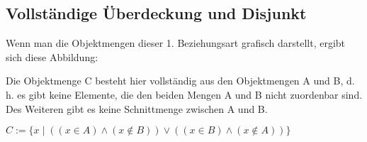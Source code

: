       \subsection{Vollst\"andige \"Uberdeckung und Disjunkt}
        \label{complette_disjunkt}
        Wenn man die Objektmengen dieser 1. Beziehungsart grafisch darstellt,
        ergibt sich diese Abbildung:

        \begin{center}
        \end{center}
        Die Objektmenge C besteht hier vollst\"andig aus den Objektmengen A und
        B, d. h. es gibt keine Elemente, die den beiden Mengen A und B nicht
        zuordenbar sind. Des Weiteren gibt es keine Schnittmenge zwischen A und
        B.

        $C := \{x \mid ((x \in A) \wedge (x \notin B)) \vee ((x \in B) \wedge (x \notin A))\}$

